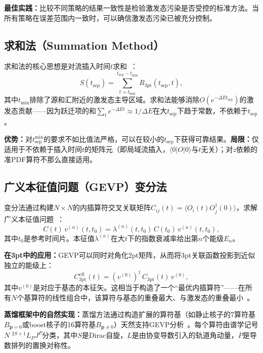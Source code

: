 \documentclass[12pt,a4paper]{ctexart}
\theoremstyle{definition}
\begin{document}
\textbf{最佳实践：}比较不同策略的结果一致性是检验激发态污染是否受控的标准方法。当所有策略在误差范围内一致时，可以确信激发态污染已被充分控制。

\subsection{求和法（Summation Method）}

求和法的核心思想是对流插入时间$t$求和~\cite{correlationFunctions2026}：
\begin{equation}\label{eq:summation}
    S(t_{\text{sep}}) = \sum_{t = t_{\text{min}}}^{t_{\text{sep}}-t_{\text{min}}} R_{3\text{pt}}(t_{\text{sep}}, t),
\end{equation}
其中$t_{\text{min}}$排除了源和汇附近的激发态主导区域。求和法能够消除$O(e^{-\Delta E t_{\text{sep}}})$的激发态贡献——因为跃迁项的和$\sum_t e^{-\Delta E t} \approx 1/\Delta E$在大$t_{\text{sep}}$下趋于常数，不依赖于$t_{\text{sep}}$。

\textbf{优势：}对$t_{\text{sep}}^{\min}$的要求不如比值法严格，可以在较小的$t_{\text{sep}}$下获得可靠结果。\textbf{局限：}仅适用于不依赖于插入时间$t$的矩阵元（即局域流插入，$\langle 0|O|0\rangle$与$t$无关）；对$z$依赖的准PDF算符不那么直接适用。

\subsection{广义本征值问题（GEVP）变分法}

变分法通过构建$N \times N$的内插算符交叉关联矩阵$C_{ij}(t) = \langle O_i(t) O_j^\dagger(0) \rangle$，求解广义本征值问题~\cite{hadronSpectroscopy2026,correlationFunctions2026}：
\begin{equation}\label{eq:GEVP}
    C(t)\,v^{(n)}(t, t_0) = \lambda^{(n)}(t, t_0)\,C(t_0)\,v^{(n)}(t, t_0),
\end{equation}
其中$t_0$是参考时间片。本征值$\lambda^{(n)}$在大$t$下的指数衰减率给出第$n$个能级$E_n$。

\textbf{在3pt中的应用：}GEVP可以同时对角化2pt矩阵，从而将3pt关联函数投影到近似独立的能级上：
\begin{equation}
    C_{3\text{pt}}^{\text{eff}}(t) = (v^{(0)})^\dagger\,C_{3\text{pt}}(t)\,v^{(0)},
\end{equation}
其中$v^{(0)}$是对应于基态的本征矢。这相当于构造了一个``最优内插算符''——在所有$N$个基算符的线性组合中，该算符与基态的重叠最大、与激发态的重叠最小~\cite{hadronSpectroscopy2026,distillation2026}。

\textbf{蒸馏框架中的自然实现：}蒸馏方法通过构造扩展的算符基（如静止核子的7算符基$B_{\mathbf{p}=0}$或boost核子的16算符基$B_{\mathbf{p}\neq 0}$）天然支持GEVP分析~\cite{correlationFunctions2026}。每个算符由谱学记号$N\;^{2S+1}L_P J^P$分类，其中$S$是Dirac自旋，$L$是由协变导数引入的轨道角动量，$P$是导数排列的置换对称性。
\end{document}
